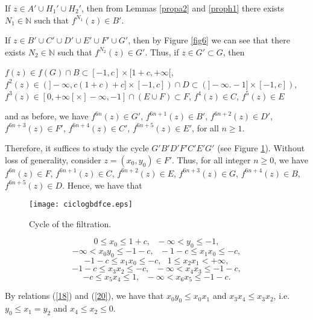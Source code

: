 \documentclass[11pt]{amsart}
\theoremstyle{definition}
\begin{document}
	If $z\in A'\cup H_1'\cup H_2'$, then from Lemmas \ref{propa2} and \ref{proph1} there exists $N_1\in\mathbb{N}$ such that $f^{N_1}(z)\in B'$.
	
	If $z\in B'\cup C'\cup D'\cup E'\cup F'\cup G'$, then by Figure \ref{fig6} we can see that there exists $N_2\in\mathbb{N}$ such that $f^{N_2}(z)\in G'$. Thus, if $z\in G'\subset G$, then
\begin{center} 	
	$f(z)\in f(G)\cap B\subset [-1,c]\times[1+c,+\infty[$,
	$f^2(z)\in(]-\infty,c(1+c)+c]\times[-1,c])\cap D\subset (]-\infty.-1]\times[-1,c])$,
	$f^3(z)\in [0,+\infty[\times]-\infty,-1]\cap (E\cup F)\subset F$, $f^4(z)\in C$, $f^5(z)\in E$
\end{center} 
and as before, we have $f^{6n}(z)\in G'$, $f^{6n+1}(z)\in B'$, $f^{6n+2}(z)\in D'$, $f^{6n+3}(z)\in F'$, $f^{6n+4}(z)\in C'$, $f^{6n+5}(z)\in E'$, for all $n\geq 1$.
	
	Therefore, it suffices to study the cycle $G'B'D'F'C'E'G'$ (see Figure \ref{fig6f}). Without loss of generality, consider $z=(x_0,y_0)\in F'$. Thus, for all integer $n\geq 0$, we have $f^{6n}(z)\in F$, $f^{6n+1}(z)\in C$, $f^{6n+2}(z)\in E$, $f^{6n+3}(z)\in G$, $f^{6n+4}(z)\in B$, $f^{6n+5}(z)\in D$. Hence, we have that
	
	\begin{figure}[!h]
		\centering
		\texttt{[image: ciclogbdfce.eps]}
		\caption{Cycle of the filtration.} \label{fig6f}
	\end{figure}
	\begin{equation}
	0\leq x_0\leq 1+c, \textrm{   } -\infty <y_0\leq -1, \label{17}
	\end{equation}
	\begin{equation}
	-\infty< x_0y_0\leq -1-c, \textrm{   } -1-c \leq x_1x_0\leq -c, \label{18}
	\end{equation}
	\begin{equation}
	-1-c \leq x_1x_0\leq -c, \textrm{   } 1 \leq x_2x_1<+\infty, \label{19}
	\end{equation}
	\begin{equation}
	-1-c \leq x_3x_2\leq -c, \textrm{   } -\infty < x_4x_3\leq-1-c, \label{20}
	\end{equation}
	\begin{equation}
	-c\leq x_5x_4\leq 1, \textrm{   } -\infty <x_6x_5\leq -1-c. \label{21}
	\end{equation}
	
	By relations (\ref{18}) and (\ref{20}), we have that $x_0y_0\leq x_0x_1$ and $x_3x_4\leq x_3x_2$, i.e. $y_0\leq x_1=y_2$ and $x_4\leq x_2\leq 0$.
	
\end{document}
